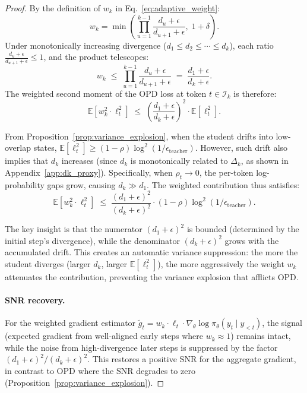 \begin{proof}
By the definition of $w_k$ in Eq.~\eqref{eq:adaptive_weight}:
\begin{equation}
    w_k = \min\!\left(\prod_{u=1}^{k-1} \frac{d_u + \epsilon}{d_{u+1} + \epsilon},\; 1+\delta\right).
\end{equation}
Under monotonically increasing divergence ($d_1 \le d_2 \le \cdots \le d_k$), each ratio $\frac{d_u + \epsilon}{d_{u+1} + \epsilon} \le 1$, and the product telescopes:
\begin{equation}
    w_k \;\le\; \prod_{u=1}^{k-1} \frac{d_u + \epsilon}{d_{u+1} + \epsilon} \;=\; \frac{d_1 + \epsilon}{d_k + \epsilon}.
\end{equation}
The weighted second moment of the OPD loss at token $t \in \mathcal{I}_k$ is therefore:
\begin{equation}
    \mathbb{E}[w_k^2 \cdot \ell_t^2] \;\le\; \left(\frac{d_1 + \epsilon}{d_k + \epsilon}\right)^2 \cdot \mathbb{E}[\ell_t^2].
\end{equation}

From Proposition~\ref{prop:variance_explosion}, when the student drifts into low-overlap states, $\mathbb{E}[\ell_t^2] \ge (1-\rho)\log^2(1/\epsilon_{\mathrm{teacher}})$. However, such drift also implies that $d_k$ increases (since $d_k$ is monotonically related to $\Delta_k$, as shown in Appendix~\ref{app:dk_proxy}). Specifically, when $\rho_t \to 0$, the per-token log-probability gaps grow, causing $d_k \gg d_1$. The weighted contribution thus satisfies:
\begin{equation}
    \mathbb{E}[w_k^2 \cdot \ell_t^2] \;\le\; \frac{(d_1 + \epsilon)^2}{(d_k + \epsilon)^2} \cdot (1-\rho)\log^2(1/\epsilon_{\mathrm{teacher}}).
\end{equation}

The key insight is that the numerator $(d_1 + \epsilon)^2$ is bounded (determined by the initial step's divergence), while the denominator $(d_k + \epsilon)^2$ grows with the accumulated drift. This creates an automatic variance suppression: the more the student diverges (larger $d_k$, larger $\mathbb{E}[\ell_t^2]$), the more aggressively the weight $w_k$ attenuates the contribution, preventing the variance explosion that afflicts OPD.

\paragraph{SNR recovery.}
For the weighted gradient estimator $\tilde{g}_t = w_k \cdot \ell_t \cdot \nabla_\theta \log \pi_\theta(y_t \mid y_{<t})$, the signal (expected gradient from well-aligned early steps where $w_k \approx 1$) remains intact, while the noise from high-divergence later steps is suppressed by the factor $(d_1 + \epsilon)^2/(d_k + \epsilon)^2$. This restores a positive SNR for the aggregate gradient, in contrast to OPD where the SNR degrades to zero (Proposition~\ref{prop:variance_explosion}).
\end{proof}

